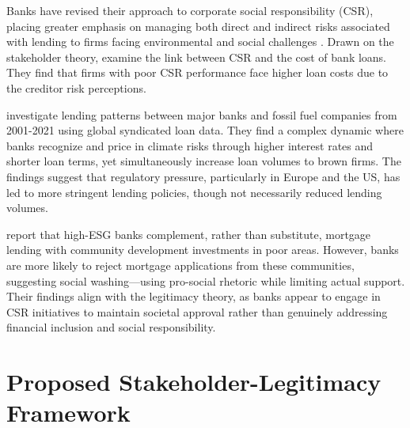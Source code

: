\documentclass[
  authoryear]{elsarticle}
\begin{document}
Banks have revised their approach to corporate social responsibility
(CSR), placing greater emphasis on managing both direct and indirect
risks associated with lending to firms facing environmental and social
challenges \citep{CARNEVALE2012}. Drawn on the stakeholder theory,
\citet{GOSS2011} examine the link between CSR and the cost of bank
loans. They find that firms with poor CSR performance face higher loan
costs due to the creditor risk perceptions.

\citet{DEMETRIADES2025} investigate lending patterns between major banks
and fossil fuel companies from 2001-2021 using global syndicated loan
data. They find a complex dynamic where banks recognize and price in
climate risks through higher interest rates and shorter loan terms, yet
simultaneously increase loan volumes to brown firms. The findings
suggest that regulatory pressure, particularly in Europe and the US, has
led to more stringent lending policies, though not necessarily reduced
lending volumes.

\citet{BASU2022} report that high-ESG banks complement, rather than
substitute, mortgage lending with community development investments in
poor areas. However, banks are more likely to reject mortgage
applications from these communities, suggesting social washing---using
pro-social rhetoric while limiting actual support. Their findings align
with the legitimacy theory, as banks appear to engage in CSR initiatives
to maintain societal approval rather than genuinely addressing financial
inclusion and social responsibility.

\section{Proposed Stakeholder-Legitimacy
Framework}\label{proposed-stakeholder-legitimacy-framework}
\end{document}
